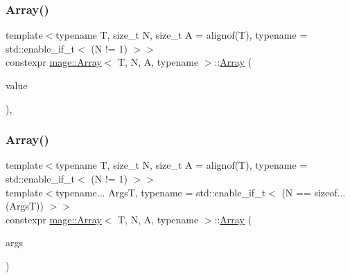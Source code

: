 \subsubsection{\texorpdfstring{Array()}{Array()}\hspace{0.1cm}{\footnotesize\ttfamily [2/10]}}
{\footnotesize\ttfamily template$<$typename T, size\+\_\+t N, size\+\_\+t A = alignof(\+T), typename  = std\+::enable\+\_\+if\+\_\+t$<$ (\+N != 1) $>$$>$ \\
constexpr \mbox{\hyperlink{structmage_1_1_array}{mage\+::\+Array}}$<$ T, N, A, typename $>$\+::\mbox{\hyperlink{structmage_1_1_array}{Array}} (\begin{DoxyParamCaption}\item[{const T \&}]{value }\end{DoxyParamCaption})\hspace{0.3cm}{\ttfamily [explicit]}, {\ttfamily [noexcept]}}

\mbox{\label{structmage_1_1_array_ab6dbce28b41b7ef1e9c0195f24f378a6}} 
\subsubsection{\texorpdfstring{Array()}{Array()}\hspace{0.1cm}{\footnotesize\ttfamily [3/10]}}
{\footnotesize\ttfamily template$<$typename T, size\+\_\+t N, size\+\_\+t A = alignof(\+T), typename  = std\+::enable\+\_\+if\+\_\+t$<$ (\+N != 1) $>$$>$ \\
template$<$typename... ArgsT, typename  = std\+::enable\+\_\+if\+\_\+t$<$ (\+N == sizeof...(\+Args\+T)) $>$$>$ \\
constexpr \mbox{\hyperlink{structmage_1_1_array}{mage\+::\+Array}}$<$ T, N, A, typename $>$\+::\mbox{\hyperlink{structmage_1_1_array}{Array}} (\begin{DoxyParamCaption}\item[{ArgsT \&\&...}]{args }\end{DoxyParamCaption})\hspace{0.3cm}{\ttfamily [noexcept]}}

\mbox{\label{structmage_1_1_array_a1e0a4b5cebb34709b32bc13e9ab917e1}} 
